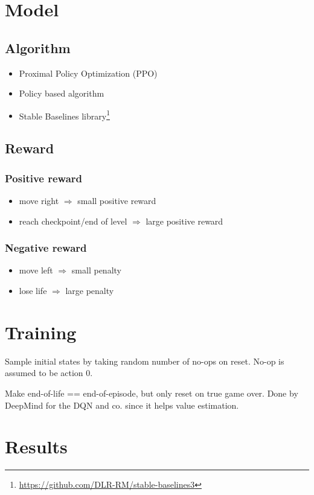 \documentclass{article}
\begin{document}
    \section{Model}
    \subsection{Algorithm}
    \begin{itemize}
        \item Proximal Policy Optimization (PPO)
        \item Policy based algorithm
        \item Stable Baselines library\footnote{\url{https://github.com/DLR-RM/stable-baselines3}}
    \end{itemize}
    \subsection{Reward}
    \subsubsection*{Positive reward}
    \begin{itemize}
        \item move right $\Rightarrow$ small positive reward
        \item reach checkpoint/end of level $\Rightarrow$ large positive reward
    \end{itemize}
    \subsubsection*{Negative reward}
    \begin{itemize}
        \item move left $\Rightarrow$ small penalty
        \item lose life $\Rightarrow$ large penalty
    \end{itemize}

    \section{Training}
    Sample initial states by taking random number of no-ops on reset.
    No-op is assumed to be action 0.

    Make end-of-life == end-of-episode, but only reset on true game over.
    Done by DeepMind for the DQN and co. since it helps value estimation.

    \section{Results}
\end{document}
